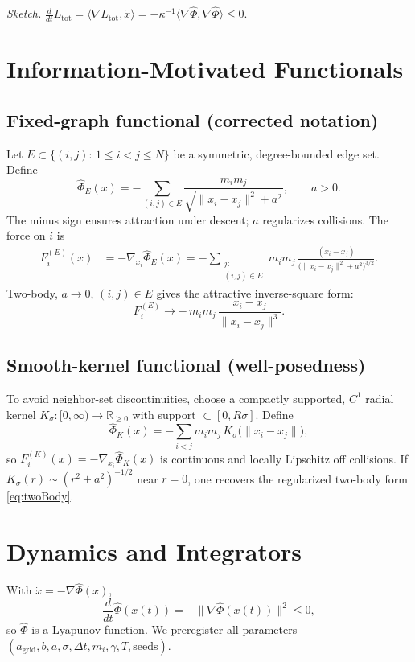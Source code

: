 \documentclass[11pt,a4paper]{article}
\numberwithin{equation}{section}
\newcommand{\R}{\mathbb{R}}
\begin{document}
\noindent\emph{Sketch.} $\frac{d}{dt}L_{\text{tot}}=\langle\nabla L_{\text{tot}},\dot x\rangle
= -\kappa^{-1}\langle\nabla\widehat{\Phi},\nabla\widehat{\Phi}\rangle \le 0.$

\section{Information-Motivated Functionals}
\subsection{Fixed-graph functional (corrected notation)}
Let $E\subset\{(i,j):\,1\le i<j\le N\}$ be a symmetric, degree-bounded edge set. Define
\begin{equation}
\label{eq:phiE}
\widehat{\Phi}_E(x)= -\sum_{(i,j)\in E} \frac{m_im_j}{\sqrt{\lVert x_i-x_j\rVert^2+a^2}},\qquad a>0.
\end{equation}
The minus sign ensures attraction under descent; $a$ regularizes collisions. The force on $i$ is
\begin{align}
\label{eq:forceE}
F^{(E)}_i(x)
&= -\nabla_{x_i}\widehat{\Phi}_E(x)
= -\sum_{\substack{j:\\(i,j)\in E}}
m_im_j\,\frac{(x_i-x_j)}{\big(\lVert x_i-x_j\rVert^2+a^2\big)^{3/2}}.
\end{align}
Two-body, $a\to 0$, $(i,j)\in E$ gives the attractive inverse-square form:
\begin{equation}
\label{eq:twoBody}
F^{(E)}_i \to -\,m_im_j\,\frac{x_i-x_j}{\lVert x_i-x_j\rVert^3}.
\end{equation}

\subsection{Smooth-kernel functional (well-posedness)}
To avoid neighbor-set discontinuities, choose a compactly supported, $C^1$ radial kernel $K_\sigma:[0,\infty)\to\R_{\ge 0}$ with support $\subset[0,R\sigma]$. Define
\begin{equation}
\label{eq:phiK}
\widehat{\Phi}_K(x)= -\sum_{i<j} m_im_j\,K_\sigma\!\big(\lVert x_i-x_j\rVert\big),
\end{equation}
so $F^{(K)}_i(x)=-\nabla_{x_i}\widehat{\Phi}_K(x)$ is continuous and locally Lipschitz off collisions. If $K_\sigma(r)\sim (r^2+a^2)^{-1/2}$ near $r=0$, one recovers the regularized two-body form \eqref{eq:twoBody}.

\section{Dynamics and Integrators}
With $\dot x=-\nabla\widehat{\Phi}(x)$,
\begin{equation}
\frac{d}{dt}\widehat{\Phi}(x(t)) = -\lVert\nabla\widehat{\Phi}(x(t))\rVert^2 \le 0,
\end{equation}
so $\widehat{\Phi}$ is a Lyapunov function. We preregister all parameters $(a_{\text{grid}},b,a,\sigma,\Delta t,m_i,\gamma,T,\text{seeds})$.
\end{document}
